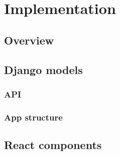 \chapter{Implementation}
\label{chapter:implementation}


\section{Overview}
\label{sec:overview}

\section{Django models}
\label{sec:django-models}

\subsection{API}
\label{sub-sec:api}



\subsection{App structure}
\label{sub-sec:app-structure}

\section{React components}
\label{sec:react0components}
